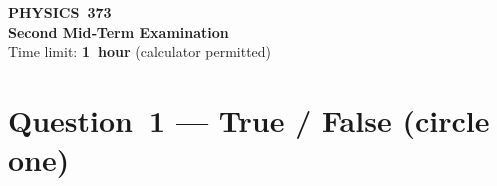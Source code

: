 \documentclass[12pt]{article}
\begin{document}
\begin{center}
  {\Large\bfseries PHYSICS 373 \\
               Second Mid‑Term Examination}\\[2ex]
  Time limit: \textbf{1 hour} \quad (calculator permitted)
\end{center}

\newpage
\newpage
\section*{Question 1 — True / False (circle one)}
\end{document}
